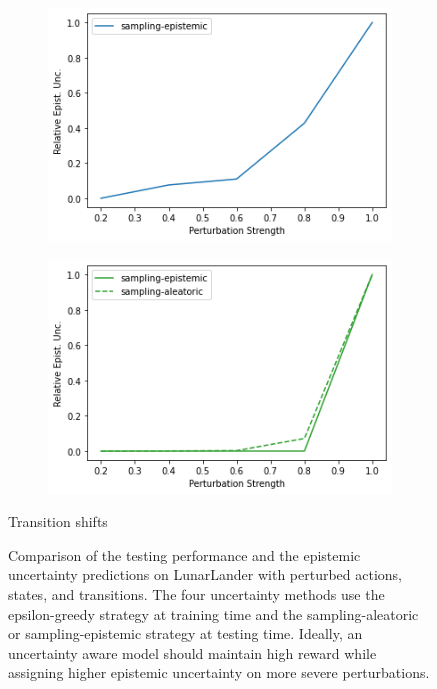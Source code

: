 \begin{figure}
\begin{subfigure}{.24\textwidth}
        \includegraphics[width=\textwidth]{sections/011_icml2022/resources/transition_shift-DKL-LunarLanderShift-v0-mean_epistemic_uncertainty_.png}
    \end{subfigure}
    \begin{subfigure}{.24\textwidth}
        \includegraphics[width=\textwidth]{sections/011_icml2022/resources/transition_shift-PostNet-LunarLanderShift-v0-mean_epistemic_uncertainty_.png}
    \end{subfigure}
    \vspace{-3mm}
    \caption*{Transition shifts}
    \vspace{2mm}

    \caption{Comparison of the testing performance and the epistemic uncertainty predictions on LunarLander with perturbed actions, states, and transitions. The four uncertainty methods use the epsilon-greedy strategy at training time and the sampling-aleatoric or sampling-epistemic strategy at testing time. Ideally, an uncertainty aware model should maintain high reward while assigning higher epistemic uncertainty on more severe perturbations.}
    \label{fig:strategy-shift-testing-performance-lunarlander}
        \vspace{-3mm}
\end{figure}